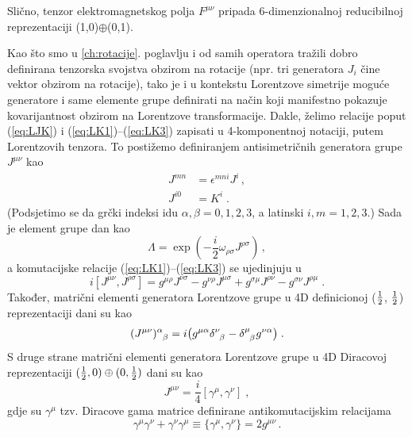 Slično, tenzor elektromagnetskog polja $F^{\mu\nu}$ pripada
6-dimenzionalnoj reducibilnoj reprezentaciji (1,0)$\oplus$(0,1).


Kao što smo u \ref{ch:rotacije}. poglavlju i od samih operatora tražili
dobro definirana tenzorska svojstva obzirom na rotacije
(npr. tri generatora $J_i$ čine vektor obzirom na rotacije), tako
je i u kontekstu Lorentzove simetrije moguće generatore i
same elemente grupe definirati na način koji manifestno pokazuje
kovarijantnost obzirom na Lorentzove transformacije.
Dakle, želimo relacije poput (\ref{eq:LJK}) i (\ref{eq:LK1})--(\ref{eq:LK3}) 
zapisati u 4-komponentnoj notaciji, putem Lorentzovih tenzora.
To postižemo definiranjem antisimetričnih generatora 
grupe  $J^{\mu\nu}$ kao
\begin{align}
J^{mn}& = \epsilon^{mni} J^i \,, \label{eq:defJmn}\\
J^{i0}& = K^i \;.
\label{eq:defJi0}
\end{align}
(Podsjetimo se da grčki indeksi idu $\alpha,\beta = 0,1,2,3$, a 
latinski $i,m = 1,2,3$.)  
Sada je element grupe  dan kao
\begin{equation}
 \Lambda = \exp\left(-\frac{i}{2} \omega_{\rho\sigma} J^{\rho\sigma}\right) \,,
\label{eq:4DLorentz}
\end{equation}
a komutacijske relacije (\ref{eq:LK1})--(\ref{eq:LK3}) se ujedinjuju u
\begin{equation}
i [ J^{\mu\nu}, J^{\rho\sigma}] = g^{\mu\rho} J^{\nu\sigma}
- g^{\nu\rho} J^{\mu\sigma} + g^{\sigma\mu} J^{\rho\nu}
- g^{\sigma\nu} J^{\rho\mu} \;.
\label{eq:4DLorKom}
\end{equation}
Također, matrični elementi generatora Lorentzove grupe u
4D definicionoj ($\frac{1}{2}$, $\frac{1}{2}$) reprezentaciji dani su kao
\begin{equation}
\tensor{(J^{\mu\nu})}{^\alpha_\beta} = i \big(
g^{\mu\alpha}\tensor{\delta}{^\nu_\beta} - \tensor{\delta}{^\mu_\beta}
g^{\nu\alpha} \big) \;.
\label{eq:4DJmn}
\end{equation}
S druge strane matrični elementi generatora Lorentzove grupe u
4D Diracovoj reprezentaciji
$(\frac{1}{2}, 0) \oplus (0, \frac{1}{2})$
dani su kao
\begin{equation}
 J^{\mu\nu} = \frac{i}{4} [\gamma^\mu, \gamma^\nu] \;,
\label{eq:DiracJ}
\end{equation}
gdje su $\gamma^\mu$ tzv. Diracove gama matrice definirane
antikomutacijskim relacijama
\begin{equation}
 \gamma^\mu\gamma^\nu + \gamma^\nu \gamma^\mu
\equiv \{\gamma^\mu, \gamma^\nu\} = 2 g^{\mu\nu} \,.
\label{eq:DiracGamma}
\end{equation}
